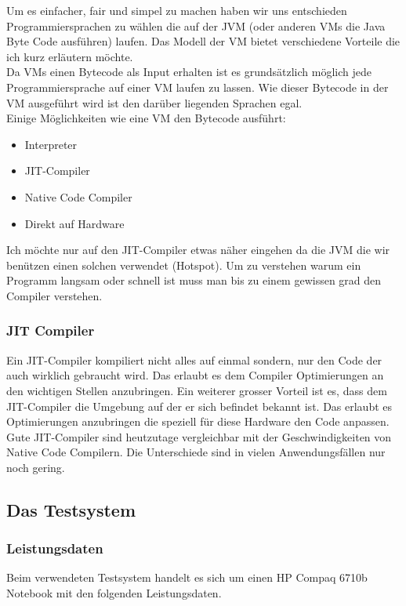 \documentclass{fancydocument}
\begin{document}
Um es einfacher, fair und simpel zu machen haben wir uns entschieden
Programmiersprachen zu wählen die auf der JVM (oder anderen VMs die
Java Byte Code ausführen) laufen. Das Modell der VM bietet
verschiedene Vorteile die ich kurz erläutern möchte.
\\
Da VMs einen Bytecode als Input erhalten ist es grundsätzlich möglich
jede Programmiersprache auf einer VM laufen zu lassen. Wie dieser
Bytecode in der VM ausgeführt wird ist den darüber liegenden Sprachen
egal.\\ 
Einige Möglichkeiten wie eine VM den Bytecode ausführt:


\begin{itemize}
\item Interpreter
\item JIT-Compiler
\item Native Code Compiler
\item Direkt auf Hardware
\end{itemize}

Ich m\"ochte nur auf den JIT-Compiler etwas n\"aher eingehen da die JVM
die wir ben\"utzen einen solchen verwendet (Hotspot). Um zu verstehen warum ein
Programm langsam oder schnell ist muss man bis zu einem gewissen grad
den Compiler verstehen.

\subsubsection{JIT Compiler}

Ein JIT-Compiler kompiliert nicht alles auf einmal sondern, nur den
Code der auch wirklich gebraucht wird. Das erlaubt es dem Compiler
Optimierungen an den wichtigen Stellen anzubringen. Ein weiterer
grosser Vorteil ist es, dass dem JIT-Compiler die Umgebung auf der er
sich befindet bekannt ist. Das erlaubt es Optimierungen anzubringen
die speziell für diese Hardware den Code anpassen.
\\
Gute JIT-Compiler sind heutzutage vergleichbar mit der Geschwindigkeiten
von Native Code Compilern. Die Unterschiede sind in vielen
Anwendungsf\"allen nur noch gering.

\subsection{Das Testsystem}
\subsubsection{Leistungsdaten}
Beim verwendeten Testsystem  handelt es sich um einen HP Compaq 6710b Notebook mit den folgenden Leistungsdaten.
\end{document}
